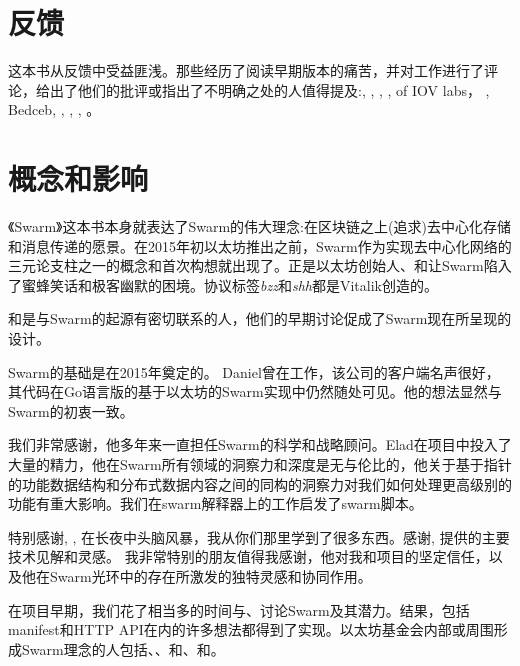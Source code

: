 \section*{反馈}

这本书从反馈中受益匪浅。那些经历了阅读早期版本的痛苦，并对工作进行了评论，给出了他们的批评或指出了不明确之处的人值得提及:, , , ,  of IOV labs， 
 , 
Bedceb, , , , 。



\section*{概念和影响}

《Swarm》这本书本身就表达了Swarm的伟大理念:在区块链之上(追求)去中心化存储和消息传递的愿景。在2015年初以太坊推出之前，Swarm作为实现去中心化网络的三元论支柱之一的概念和首次构想就出现了。正是以太坊创始人、和让Swarm陷入了蜜蜂笑话和极客幽默的困境。协议标签\emph{bzz}和\emph{shh}都是Vitalik创造的。 

和是与Swarm的起源有密切联系的人，他们的早期讨论促成了Swarm现在所呈现的设计。

Swarm的基础是在2015年奠定的。
Daniel曾在工作，该公司的客户端名声很好，其代码在Go语言版的基于以太坊的Swarm实现中仍然随处可见。他的想法显然与Swarm的初衷一致。 

我们非常感谢，他多年来一直担任Swarm的科学和战略顾问。Elad在项目中投入了大量的精力，他在Swarm所有领域的洞察力和深度是无与伦比的，他关于基于指针的功能数据结构和分布式数据内容之间的同构的洞察力对我们如何处理更高级别的功能有重大影响。我们在swarm解释器上的工作启发了swarm脚本。

特别感谢, , 在长夜中头脑风暴，我从你们那里学到了很多东西。感谢, 提供的主要技术见解和灵感。
我非常特别的朋友值得我感谢，他对我和项目的坚定信任，以及他在Swarm光环中的存在所激发的独特灵感和协同作用。

在项目早期，我们花了相当多的时间与、讨论Swarm及其潜力。结果，包括manifest和HTTP API在内的许多想法都得到了实现。以太坊基金会内部或周围形成Swarm理念的人包括、、和、和。 


